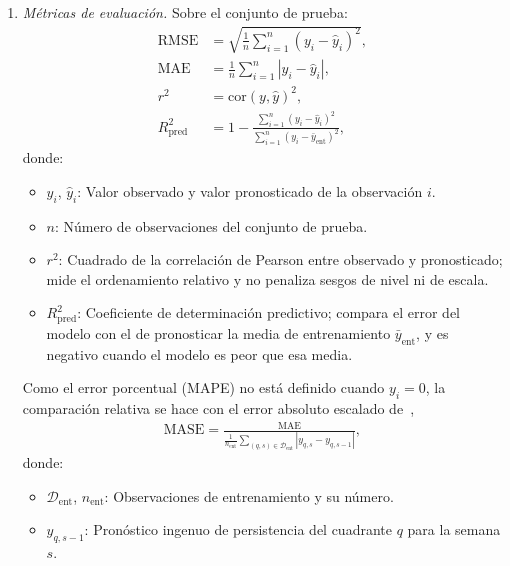 \begin{enumerate}
    \item \textit{Métricas de evaluación.} Sobre el conjunto de prueba:
    \begin{equation}
        \begin{aligned}
        \mathrm{RMSE} &= \sqrt{\frac{1}{n}\sum_{i=1}^{n} \left(y_i - \hat{y}_i\right)^{2}}, \\
        \mathrm{MAE} &= \frac{1}{n}\sum_{i=1}^{n} \left| y_i - \hat{y}_i \right|, \\
        r^{2} &= \mathrm{cor}\left(y, \hat{y}\right)^{2}, \\
        R^{2}_{\mathrm{pred}} &= 1 - \frac{\sum_{i=1}^{n} \left(y_i - \hat{y}_i\right)^{2}}{\sum_{i=1}^{n} \left(y_i - \bar{y}_{\mathrm{ent}}\right)^{2}},
        \end{aligned}
        \label{eq:metricas}
    \end{equation}
    donde:
    \begin{itemize}
        \item $y_i$, $\hat{y}_i$: Valor observado y valor pronosticado de la observación $i$.
        \item $n$: Número de observaciones del conjunto de prueba.
        \item $r^{2}$: Cuadrado de la correlación de Pearson entre observado y pronosticado; mide el ordenamiento relativo y no penaliza sesgos de nivel ni de escala.
        \item $R^{2}_{\mathrm{pred}}$: Coeficiente de determinación predictivo; compara el error del modelo con el de pronosticar la media de entrenamiento $\bar{y}_{\mathrm{ent}}$, y es negativo cuando el modelo es peor que esa media.
    \end{itemize}
    Como el error porcentual (MAPE) no está definido cuando $y_i=0$, la comparación relativa se hace con el error absoluto escalado de~\cite{hyndman2006},
    \begin{equation}
        \begin{aligned}
        \mathrm{MASE} = \frac{\mathrm{MAE}}{\frac{1}{n_{\mathrm{ent}}}\sum_{(q,s) \in \mathcal{D}_{\mathrm{ent}}} \left| y_{q,s} - y_{q,s-1} \right|},
        \end{aligned}
        \label{eq:mase}
    \end{equation}
    donde:
    \begin{itemize}
        \item $\mathcal{D}_{\mathrm{ent}}$, $n_{\mathrm{ent}}$: Observaciones de entrenamiento y su número.
        \item $y_{q,s-1}$: Pronóstico ingenuo de persistencia del cuadrante $q$ para la semana $s$.

\end{itemize}
\end{enumerate}
